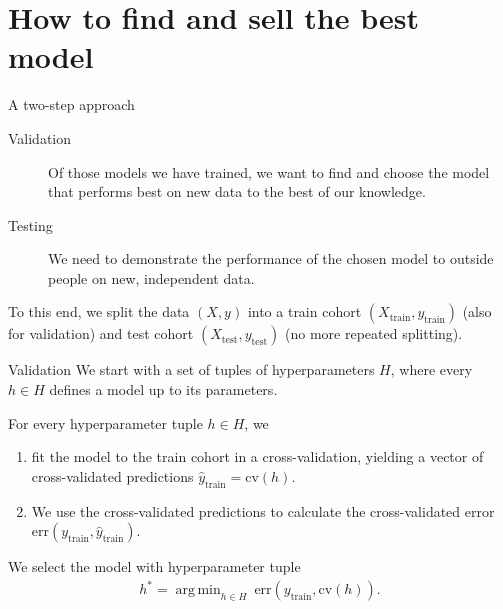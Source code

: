 \documentclass[10pt, aspectratio=169]{beamer}
\DeclareMathOperator*{\argmin}{arg\,min}
\begin{document}
\section{How to find and sell the best model}

\begin{frame}{A two-step approach}
  \begin{description}
    \item[Validation] Of those models we have trained, we want to find and choose
       the model that performs best on new data to the best of \alert{our} knowledge.
    \item[Testing] We need to demonstrate the performance of the chosen model to 
      \alert{outside} people on new, independent data.
  \end{description}

  \pause
  To this end, we split the data $(X, y)$ into a train cohort 
  $(X_{\text{train}}, y_{\text{train}})$ (also for validation) and test 
  cohort $(X_{\text{test}}, y_{\text{test}})$ (no more repeated splitting).
\end{frame}

\begin{frame}{Validation}
  We start with a set of tuples of hyperparameters $H$, where every $h \in H$ 
  defines a model up to its parameters.

  For every hyperparameter tuple $h \in H$, we
  \pause

  \begin{enumerate}
    \item fit the model to the train cohort 
    in a cross-validation, yielding a vector of cross-validated predictions 
    $\hat{y}_\text{train} = \text{cv}(h)$.
    \pause
    \item We use the cross-validated predictions to calculate the 
      cross-validated error $\text{err}(y_{\text{train}}, \hat{y}_\text{train})$.
  \end{enumerate}

  We select the model with hyperparameter tuple
  \begin{align*}
    h^* = \argmin_{h \in H} \ \text{err}(y_\text{train}, \text{cv}(h)).
  \end{align*}
\end{frame}
\end{document}
